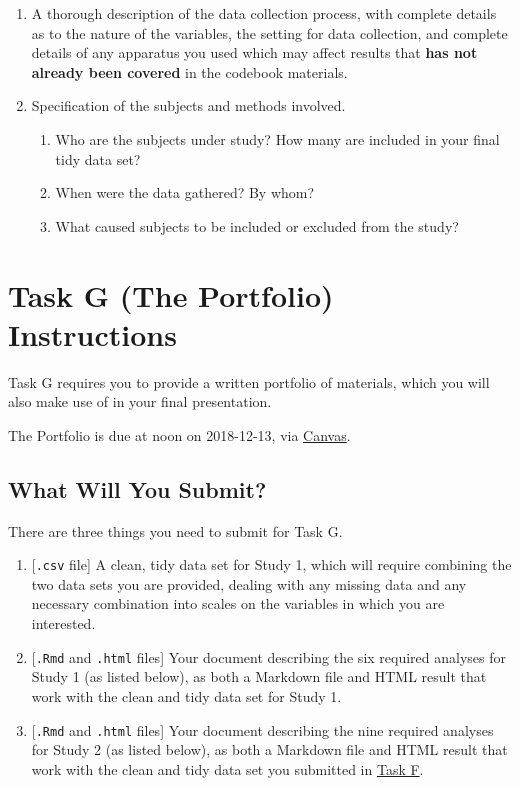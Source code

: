 \documentclass[]{book}
\providecommand{\tightlist}{%
  \setlength{\itemsep}{0pt}\setlength{\parskip}{0pt}}
\theoremstyle{definition}
\theoremstyle{definition}
\theoremstyle{definition}
\theoremstyle{remark}
\begin{document}
\begin{enumerate}
\def\labelenumi{\arabic{enumi}.}
\setcounter{enumi}{1}
\item
  A thorough description of the data collection process, with complete
  details as to the nature of the variables, the setting for data
  collection, and complete details of any apparatus you used which may
  affect results that \textbf{has not already been covered} in the
  codebook materials.
\item
  Specification of the subjects and methods involved.

  \begin{enumerate}
  \def\labelenumii{\alph{enumii}.}
  \tightlist
  \item
    Who are the subjects under study? How many are included in your
    final tidy data set?
  \item
    When were the data gathered? By whom?
  \item
    What caused subjects to be included or excluded from the study?
  \end{enumerate}
\end{enumerate}

\hypertarget{taskG}{%
\chapter{Task G (The Portfolio) Instructions}\label{taskG}}

Task G requires you to provide a written portfolio of materials, which
you will also make use of in your final presentation.

The Portfolio is due at noon on 2018-12-13, via
\href{https://canvas.case.edu/}{Canvas}.

\hypertarget{what-will-you-submit}{%
\section{What Will You Submit?}\label{what-will-you-submit}}

There are three things you need to submit for Task G.

\begin{enumerate}
\def\labelenumi{\arabic{enumi}.}
\tightlist
\item
  {[}\texttt{.csv} file{]} A clean, tidy data set for Study 1, which
  will require combining the two data sets you are provided, dealing
  with any missing data and any necessary combination into scales on the
  variables in which you are interested.
\item
  {[}\texttt{.Rmd} and \texttt{.html} files{]} Your document describing
  the six required analyses for Study 1 (as listed below), as both a
  Markdown file and HTML result that work with the clean and tidy data
  set for Study 1.
\item
  {[}\texttt{.Rmd} and \texttt{.html} files{]} Your document describing
  the nine required analyses for Study 2 (as listed below), as both a
  Markdown file and HTML result that work with the clean and tidy data
  set you submitted in \protect\hyperlink{taskF}{Task F}.
\end{enumerate}
\end{document}

